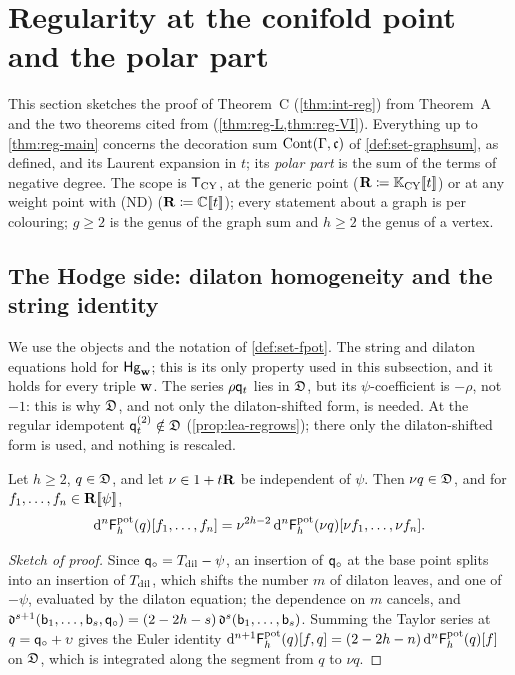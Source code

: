 \section{Regularity at the conifold point and the polar part}
\label{sec:reg}

This section sketches the proof of Theorem~C (\cref{thm:int-reg}) from Theorem~A and the two theorems cited from \cite{LP2} (\cref{thm:reg-L,thm:reg-VI}). Everything up to \cref{thm:reg-main} concerns the decoration sum $\mathrm{Cont}(\Gamma,\mathfrak{c})$ of \cref{def:set-graphsum}, as defined, and its Laurent expansion in $t$; its \emph{polar part} is the sum of the terms of negative degree. The scope is $\mathsf{T}_{\mathrm{CY}}$, at the generic point ($\mathbf{R}\coloneqq\mathbb{K}_{\mathrm{CY}}[\![ t ]\!]$) or at any weight point with (ND) ($\mathbf{R}\coloneqq\mathbb{C}[\![ t ]\!]$); every statement about a graph is per colouring; $g\geq2$ is the genus of the graph sum and $h\geq2$ the genus of a vertex.

\subsection{The Hodge side: dilaton homogeneity and the string identity}
\label{sec:reg-hodge}

We use the objects and the notation of \cref{def:set-fpot}. The string and dilaton equations hold for $\mathsf{Hg}_{\mathbf{w}}$; this is its only property used in this subsection, and it holds for every triple $\mathbf{w}$. The series $\rho\mathsf{q}_{t}$ lies in $\mathfrak{D}$, but its $\psi$-coefficient is $-\rho$, not $-1$: this is why $\mathfrak{D}$, and not only the dilaton-shifted form, is needed. At the regular idempotent $\mathsf{q}_{t}^{(2)}\notin\mathfrak{D}$ (\cref{prop:lea-regrows}); there only the dilaton-shifted form is used, and nothing is rescaled.

\begin{lem}
\label{lem:reg-H0}
Let $h\geq2$, $q\in\mathfrak{D}$, and let $\nu\in1+t\mathbf{R}$ be independent of $\psi$. Then $\nu q\in\mathfrak{D}$, and for $f_1,\dots,f_n\in\mathbf{R}[\![ \psi ]\!]$,
\begin{equation}
\label{eq:reg-H0}
\mathrm{d}^n\mathsf{F}^{\mathrm{pot}}_h(q)[f_1,\dots,f_n]=\nu^{2h-2}\,\mathrm{d}^n\mathsf{F}^{\mathrm{pot}}_h(\nu q)[\nu f_1,\dots,\nu f_n].
\end{equation}
\end{lem}

\begin{proof}[Sketch of proof]
Since $\mathsf{q}_{\circ}=T_{\mathrm{dil}}-\psi$, an insertion of $\mathsf{q}_{\circ}$ at the base point splits into an insertion of $T_{\mathrm{dil}}$, which shifts the number $m$ of dilaton leaves, and one of $-\psi$, evaluated by the dilaton equation; the dependence on $m$ cancels, and $\mathfrak{d}^{s+1}(\mathsf{b}_1,\dots,\mathsf{b}_s,\mathsf{q}_{\circ})=(2-2h-s)\,\mathfrak{d}^s(\mathsf{b}_1,\dots,\mathsf{b}_s)$. Summing the Taylor series at $q=\mathsf{q}_{\circ}+\upsilon$ gives the Euler identity $\mathrm{d}^{n+1}\mathsf{F}^{\mathrm{pot}}_h(q)[f,q]=(2-2h-n)\,\mathrm{d}^n\mathsf{F}^{\mathrm{pot}}_h(q)[f]$ on $\mathfrak{D}$, which is integrated along the segment from $q$ to $\nu q$.
\end{proof}

